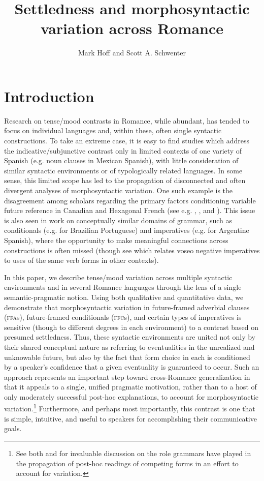 \documentclass[output=paper,colorlinks,citecolor=brown]{langscibook}
\author{Mark Hoff\affiliation{Ghent University} and Scott A. Schwenter\affiliation{The Ohio State University}}
\title{Settledness and morphosyntactic variation across Romance}
\begin{document}
\maketitle

\section{Introduction}
Research on tense/mood contrasts in Romance, while abundant, has tended to focus on individual languages and, within these, often single syntactic constructions. To take an extreme case, it is easy to find studies which address the indicative/subjunctive contrast only in limited contexts of one variety of Spanish (e.g. noun clauses in Mexican Spanish), with little consideration of similar syntactic environments or of typologically related languages. In some sense, this limited scope has led to the propagation of disconnected and often divergent analyses of morphosyntactic variation. One such example is the disagreement among scholars regarding the primary factors conditioning variable future reference in Canadian and Hexagonal French (see e.g. \citealt{PoplackTurpin1999}, \citealt{Grimm2015}, and \citealt{GudmestadEdmondsDonaldsonCarmichael2018}). This issue is also seen in work on conceptually similar domains of grammar, such as conditionals (e.g. \citealt{Perini2002} for Brazilian Portuguese) and imperatives (e.g. \citealt{Johnson2013} for Argentine Spanish), where the opportunity to make meaningful connections across constructions is often missed (though see \citealt{Johnson2015} which relates voseo negative imperatives to uses of the same verb forms in other contexts).

In this paper, we describe tense/mood variation across multiple syntactic environments and in several Romance languages through the lens of a single semantic-pragmatic notion. Using both qualitative and quantitative data, we demonstrate that morphosyntactic variation in future-framed adverbial clauses (\textsc{ffa}s), future-framed conditionals (\textsc{ffc}s), and certain types of imperatives is sensitive (though to different degrees in each environment) to a contrast based on presumed settledness. Thus, these syntactic environments are united not only by their shared conceptual nature as referring to eventualities in the unrealized and unknowable future, but also by the fact that form choice in each is conditioned by a speaker’s confidence that a given eventuality is guaranteed to occur. Such an approach represents an important step toward cross-Romance generalization in that it appeals to a single, unified pragmatic motivation, rather than to a host of only moderately successful post-hoc explanations, to account for morphosyntactic variation.\footnote{See both \citet{PoplackTurpin1999} and \citet{PoplackDion2009} for invaluable discussion on the role grammars have played in the propagation of post-hoc readings of competing forms in an effort to account for variation.} Furthermore, and perhaps most importantly, this contrast is one that is simple, intuitive, and useful to speakers for accomplishing their communicative goals.
\end{document}
